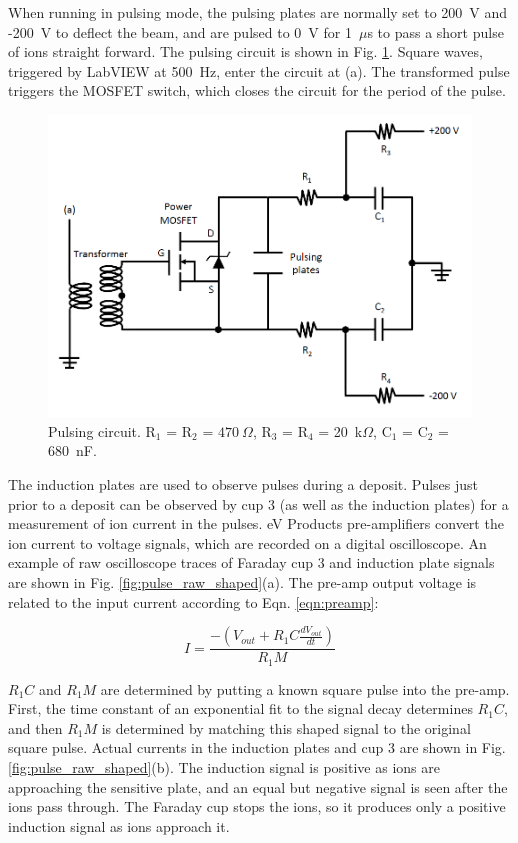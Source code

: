 When running in pulsing mode, the pulsing plates are normally set to 200~V and -200~V to deflect the beam, and are pulsed to 0~V for 1~$\mu$s to pass a short pulse of ions straight forward.  The pulsing circuit is shown in Fig. \ref{fig:pulse_circuit}.  Square waves, triggered by LabVIEW at 500~Hz, enter the circuit at (a). The transformed pulse triggers the MOSFET switch, which closes the circuit for the period of the pulse.

\begin{figure} %
        \centering
                \includegraphics[width=.85\textwidth]{figures/pulsing_circuit.png}
                \caption{Pulsing circuit.  R$_{1}$ = R$_{2}$ = $470~\Omega$, R$_{3}$ = R$_{4}$ = 20~k$\Omega$, \newline C$_{1}$ = C$_{2}$ = 680~nF. \cite{Shon}}
\label{fig:pulse_circuit}
\end{figure}

The induction plates are used to observe pulses during a deposit.  Pulses just prior to a deposit can be observed by cup 3 (as well as the induction plates) for a measurement of ion current in the pulses.  eV Products pre-amplifiers convert the ion current to voltage signals, which are recorded on a digital oscilloscope.  An example of raw oscilloscope traces of Faraday cup 3 and induction plate signals are shown in Fig. \ref{fig:pulse_raw_shaped}(a).  The pre-amp output voltage is related to the input current according to Eqn. \ref{eqn:preamp}:

\begin{equation}
I = \frac{-(V_{out} + R_{1} C \frac{dV_{out}}{dt})}{R_{1} M}
\label{eqn:preamp}
\end{equation}

\noindent
$R_{1} C$ and $R_{1} M$ are determined by putting a known square pulse into the pre-amp.  First, the time constant of an exponential fit to the signal decay determines $R_{1} C$, and then $R_{1} M$ is determined by matching this shaped signal to the original square pulse.  Actual currents in the induction plates and cup 3 are shown in Fig. \ref{fig:pulse_raw_shaped}(b).  The induction signal is positive as ions are approaching the sensitive plate, and an equal but negative signal is seen after the ions pass through.  The Faraday cup stops the ions, so it produces only a positive induction signal as ions approach it.


